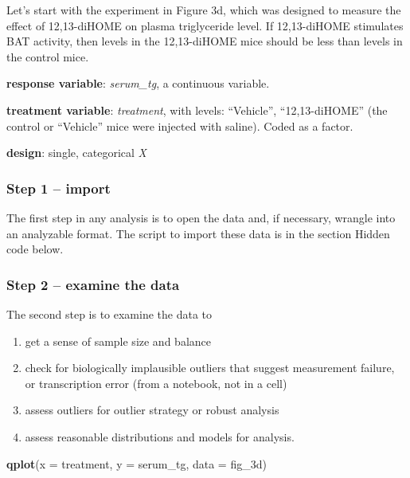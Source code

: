 \documentclass[]{book}
\newenvironment{Shaded}{\begin{snugshade}}{\end{snugshade}}
\newcommand{\DataTypeTok}[1]{\textcolor[rgb]{0.13,0.29,0.53}{#1}}
\newcommand{\KeywordTok}[1]{\textcolor[rgb]{0.13,0.29,0.53}{\textbf{#1}}}
\newcommand{\NormalTok}[1]{#1}
\providecommand{\tightlist}{%
  \setlength{\itemsep}{0pt}\setlength{\parskip}{0pt}}
\begin{document}
Let's start with the experiment in Figure 3d, which was designed to measure the effect of 12,13-diHOME on plasma triglyceride level. If 12,13-diHOME stimulates BAT activity, then levels in the 12,13-diHOME mice should be less than levels in the control mice.

\textbf{response variable}: \emph{serum\_tg}, a continuous variable.

\textbf{treatment variable}: \emph{treatment}, with levels: ``Vehicle'', ``12,13-diHOME'' (the control or ``Vehicle'' mice were injected with saline). Coded as a factor.

\textbf{design}: single, categorical \emph{X}

\hypertarget{step-1-import}{%
\subsubsection{Step 1 -- import}\label{step-1-import}}

The first step in any analysis is to open the data and, if necessary, wrangle into an analyzable format. The script to import these data is in the section Hidden code below.

\hypertarget{step-2-examine-the-data}{%
\subsubsection{Step 2 -- examine the data}\label{step-2-examine-the-data}}

The second step is to examine the data to

\begin{enumerate}
\def\labelenumi{\arabic{enumi}.}
\setcounter{enumi}{5}
\tightlist
\item
  get a sense of sample size and balance
\item
  check for biologically implausible outliers that suggest measurement failure, or transcription error (from a notebook, not in a cell)
\item
  assess outliers for outlier strategy or robust analysis
\item
  assess reasonable distributions and models for analysis.
\end{enumerate}

\begin{Shaded}
\begin{Highlighting}[]
\KeywordTok{qplot}\NormalTok{(}\DataTypeTok{x =}\NormalTok{ treatment, }\DataTypeTok{y =}\NormalTok{ serum_tg, }\DataTypeTok{data =}\NormalTok{ fig_3d)}
\end{Highlighting}
\end{Shaded}
\end{document}
